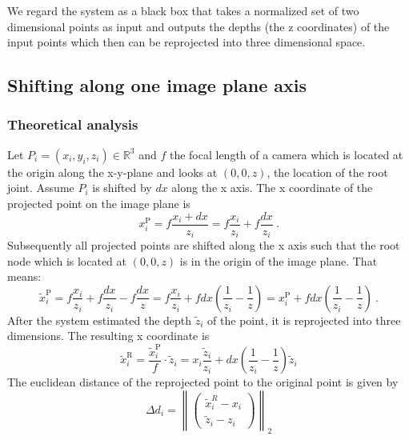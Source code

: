 \documentclass[11pt]{article}
\begin{document}
	We regard the system as a black box that takes a normalized set of two dimensional points as input and outputs the depths (the z coordinates) of the input points which then can be reprojected into three dimensional space.
	\subsection{Shifting along one image plane axis}
	\label{sec:x-shift-error}
	\subsubsection{Theoretical analysis}
	Let $P_i=(x_i, y_i, z_i) \in \mathbb{R}^3$ and $f$ the focal length of a camera which is located at the origin along the x-y-plane and looks at $(0, 0, z)$, the location of the root joint. 
	Assume $P_i$ is shifted by $dx$ along the x axis.
	The x coordinate of the projected point on the image plane is
	\begin{equation}
		x_i^\mathrm{P} = f \frac{x_i + dx}{z_i} = f \frac{x_i}{z_i} + f \frac{dx}{z_i}\ .
	\end{equation}
	Subsequently all projected points are shifted along the x axis such that the root node which is located at $(0, 0, z)$ is in the origin of the image plane. That means:
	\begin{equation}
		\widetilde{x}_i^\mathrm{P} = f \frac{x_i}{z_i} + f \frac{dx}{z_i} - f \frac{dx}{z} 
		= f \frac{x_i}{z_i} + f dx (\frac{1}{z_i} - \frac{1}{z})
		= x_i^\mathrm{P} + f dx (\frac{1}{z_i} - \frac{1}{z})\ .
	\end{equation}
	After the system estimated the depth $\widetilde{z}_i$ of the point, it is reprojected into three dimensions. The resulting x coordinate is 
	\begin{equation}
		\widetilde{x}_i^\mathrm{R} = \frac{\widetilde{x}_i^\mathrm{P}}{f} \cdot \widetilde{z}_i
		= x_i \frac{\widetilde{z}_i}{z_i} + dx (\frac{1}{z_i} - \frac{1}{z}) \widetilde{z}_i
	\end{equation}
	The euclidean distance of the reprojected point to the original point is given by
	\begin{equation}
	\label{eq:delta-d}
		\Delta d_i = \left \| 
		\begin{pmatrix}
			\widetilde{x}_i^R - x_i \\
			\widetilde{z}_i - z_i
		\end{pmatrix}
		\right \|_2
	\end{equation}
\end{document}

